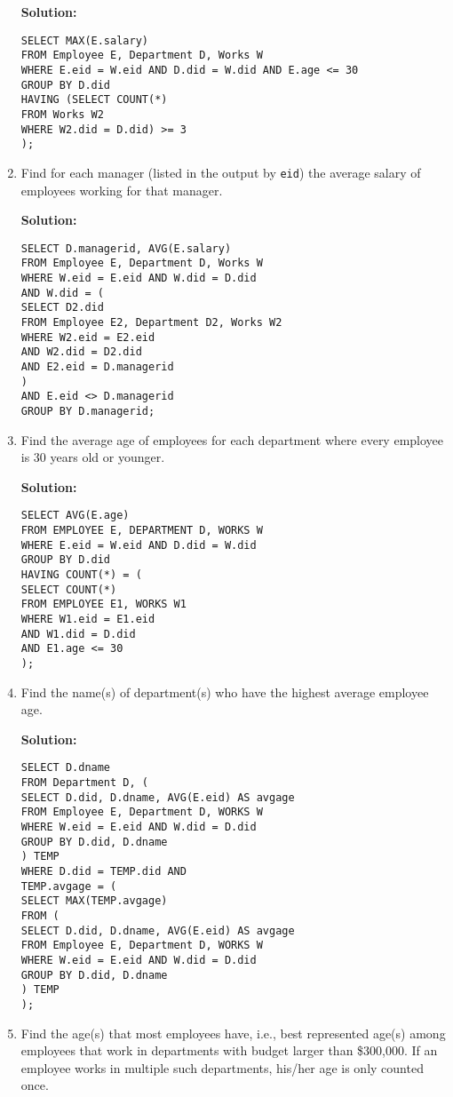 \begin{enumerate}
\textbf{Solution:}

\begin{verbatim}
SELECT MAX(E.salary)
FROM Employee E, Department D, Works W
WHERE E.eid = W.eid AND D.did = W.did AND E.age <= 30
GROUP BY D.did
HAVING (SELECT COUNT(*)
FROM Works W2
WHERE W2.did = D.did) >= 3
);
\end{verbatim}

\item Find for each manager (listed in the output by \texttt{eid}) the average salary of employees working for that manager.

\textbf{Solution:}

\begin{verbatim}
SELECT D.managerid, AVG(E.salary)
FROM Employee E, Department D, Works W
WHERE W.eid = E.eid AND W.did = D.did
AND W.did = (
SELECT D2.did
FROM Employee E2, Department D2, Works W2
WHERE W2.eid = E2.eid
AND W2.did = D2.did
AND E2.eid = D.managerid
)
AND E.eid <> D.managerid
GROUP BY D.managerid;
\end{verbatim}

\item Find the average age of employees for each department where every employee is 30 years old or younger.

\textbf{Solution:}

\begin{verbatim}
SELECT AVG(E.age)
FROM EMPLOYEE E, DEPARTMENT D, WORKS W
WHERE E.eid = W.eid AND D.did = W.did
GROUP BY D.did
HAVING COUNT(*) = (
SELECT COUNT(*)
FROM EMPLOYEE E1, WORKS W1
WHERE W1.eid = E1.eid
AND W1.did = D.did
AND E1.age <= 30
);
\end{verbatim}

\item Find the name(s) of department(s) who have the highest average employee age.

\textbf{Solution:}

\begin{verbatim}
SELECT D.dname
FROM Department D, (
SELECT D.did, D.dname, AVG(E.eid) AS avgage
FROM Employee E, Department D, WORKS W
WHERE W.eid = E.eid AND W.did = D.did
GROUP BY D.did, D.dname
) TEMP
WHERE D.did = TEMP.did AND
TEMP.avgage = (
SELECT MAX(TEMP.avgage)
FROM (
SELECT D.did, D.dname, AVG(E.eid) AS avgage
FROM Employee E, Department D, WORKS W
WHERE W.eid = E.eid AND W.did = D.did
GROUP BY D.did, D.dname
) TEMP
);
\end{verbatim}

\item Find the age(s) that most employees have, i.e., best represented age(s) among employees that work in departments with budget larger than \$300,000. If an employee works in multiple such departments, his/her age is only counted once.


\end{enumerate}

